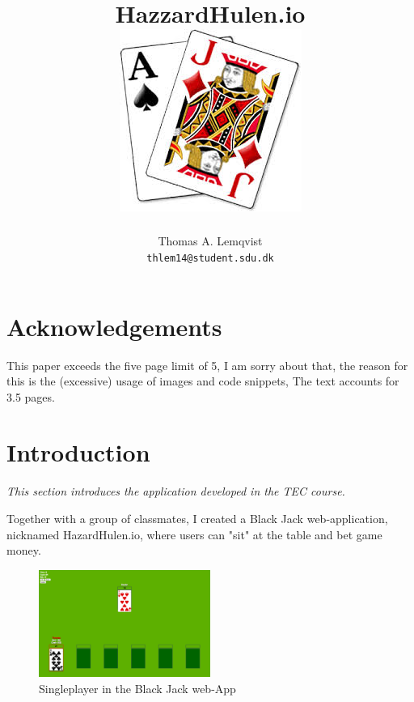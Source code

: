 \documentclass[a4paper]{article}
\title{HazzardHulen.io\\[4cm]
\includegraphics[width=.7\textwidth]{../blackjack}
\vfill}
\author{
  Thomas A. Lemqvist\\
  \texttt{thlem14@student.sdu.dk}
}
\begin{document}
\pagestyle{fancy}
\fancyhf{}

\maketitle
\thispagestyle{empty}
\newpage
\hspace{0cm}
\vfill
\tableofcontents

\vfill

\section{Acknowledgements}
This paper exceeds the five page limit of 5, I am sorry about that, the reason for this is the (excessive) usage of images and code snippets, The text accounts for 3.5 pages.

\vfill
\newpage

\setcounter{page}{1}




\section{Introduction}
\textit{This section introduces the application developed in the TEC course.}

Together with a group of classmates, I created a Black Jack web-application, nicknamed HazardHulen.io, where users can "sit" at the table and bet game money.

\begin{figure}[H]
  \centering
  \includegraphics[width=0.5\textwidth]{images/singleplayer}	
  \caption{Singleplayer in the Black Jack web-App}
  \label{sp:bj}
\end{figure}
\end{document}
